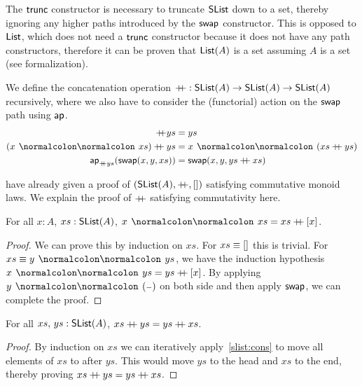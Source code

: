 \begin{toappendix}
    The $\operatorname{\mathsf{trunc}}$ constructor is necessary to truncate $\operatorname{\mathsf{SList}}$ down to a set,
    thereby ignoring any higher paths introduced by the $\operatorname{\mathsf{swap}}$ constructor.
    This is opposed to $\operatorname{\mathsf{List}}$, which does not need a $\operatorname{\mathsf{trunc}}$ constructor
    because it does not have any path constructors, therefore it can be proven that $\operatorname{\mathsf{List}}(A)$
    is a set assuming $A$ is a set (see formalization).

    \begin{definition}[Concatenation]
        We define the concatenation operation $\mathbin{+\kern -0.4em+} : \operatorname{\mathsf{SList}}(A) \to \operatorname{\mathsf{SList}}(A) \to \operatorname{\mathsf{SList}}(A)$
        recursively, where we also have to consider the (functorial) action on the $\operatorname{\mathsf{swap}}$ path using $\operatorname{\mathsf{ap}}$.
        \begin{align*}
            [] \concat ys                                 & = ys                               \\
            (x \cons xs) \concat ys                       & = x \cons (xs \concat ys)          \\
            \term{ap}_{\concat ys}(\term{swap}(x, y, xs)) & = \term{swap}(x, y, ys \concat xs)
        \end{align*}
    \end{definition}

    \cite{choudhuryFreeCommutativeMonoids2023} have already given a proof of $(\operatorname{\mathsf{SList}}(A), \mathbin{+\kern -0.4em+}, [])$ satisfying
    commutative monoid laws. We explain the proof of $\mathbin{+\kern -0.4em+}$ satisfying commutativity here.

    \begin{lemma}\label{slist:cons}
        For all $x : A$, $xs : \operatorname{\mathsf{SList}}(A)$, $x \cons xs = xs \concat [ x ]$.
    \end{lemma}

    \begin{proof}
        We can prove this by induction on $xs$.
        For $xs \mathrel{\equiv} []$ this is trivial. For $xs \jdgeq y \cons ys$, we have the induction hypothesis $x \cons ys = ys \concat [ x ]$.
        By applying $y \cons (\blank)$ on both side and then apply $\operatorname{\mathsf{swap}}$, we can complete the proof.
    \end{proof}

    \begin{theorem}[Commutativity]\label{slist:comm}
        For all $xs,\,ys : \operatorname{\mathsf{SList}}(A)$, $xs \mathbin{+\kern -0.4em+} ys = ys \mathbin{+\kern -0.4em+} xs$.
    \end{theorem}

    \begin{proof}
        By induction on $xs$ we can iteratively apply~\cref{slist:cons} to move all elements of $xs$
        to after $ys$. This would move $ys$ to the head and $xs$ to the end, thereby proving
        $xs \mathbin{+\kern -0.4em+} ys = ys \mathbin{+\kern -0.4em+} xs$.
    \end{proof}
\end{toappendix}

